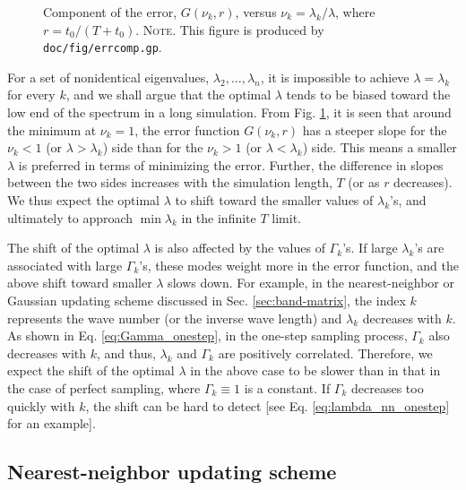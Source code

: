 \documentclass[reprint, floatfix]{revtex4-1}
\newcommand{\note}[1]{{\color{DarkGreen}\footnotesize \textsc{Note.} #1}}
\begin{document}
{\begin{figure}[h]
\begin{center}
  \caption{
    \label{fig:err_component}
    Component of the error, $G(\nu_k, r)$,
    versus $\nu_k = \lambda_k / \lambda$,
    where $r = t_0 / (T + t_0)$.
    \note{This figure is produced by
      \texttt{doc/fig/errcomp.gp}.
    }
  }
\end{center}
\end{figure}



For a set of nonidentical eigenvalues,
$\lambda_2, \dots, \lambda_n$,
it is impossible to achieve $\lambda = \lambda_k$
for every $k$,
and we shall argue that
the optimal $\lambda$
tends to be biased toward
the low end of the spectrum
in a long simulation.
%
From Fig. \ref{fig:err_component},
it is seen that around the minimum at $\nu_k = 1$,
the error function $G(\nu_k, r)$
has a steeper slope for the $\nu_k < 1$
(or $\lambda > \lambda_k$) side
than for the $\nu_k > 1$ (or $\lambda < \lambda_k$) side.
%
This means a smaller $\lambda$ is preferred
in terms of minimizing the error.
%
Further, the difference in slopes
between the two sides increases
with the simulation length, $T$
(or as $r$ decreases).
%
We thus expect the optimal $\lambda$
to shift toward the smaller values of $\lambda_k$'s,
and ultimately to approach $\min \lambda_k$
in the infinite $T$ limit.

The shift of the optimal $\lambda$
is also affected by the values of $\Gamma_k$'s.
%
If large $\lambda_k$'s are associated with
large $\Gamma_k$'s,
these modes weight more in the error function,
and the above shift toward smaller $\lambda$
slows down.
%
For example,
in the nearest-neighbor or Gaussian updating scheme
discussed in Sec. \ref{sec:band-matrix},
the index $k$ represents the wave number
(or the inverse wave length)
and $\lambda_k$ decreases with $k$.
%
As shown in Eq. \eqref{eq:Gamma_onestep},
in the one-step sampling process,
$\Gamma_k$ also decreases with $k$,
and thus, $\lambda_k$ and $\Gamma_k$
are positively correlated.
%
Therefore, we expect the shift of the optimal $\lambda$
in the above case
to be slower than in that in the case of perfect sampling,
where $\Gamma_k \equiv 1$ is a constant.
%
If $\Gamma_k$ decreases too quickly with $k$,
the shift can be hard to detect
[see Eq. \eqref{eq:lambda_nn_onestep} for an example].
}


\subsection{Nearest-neighbor updating scheme}
\end{document}
